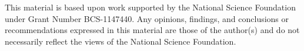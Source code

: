 \documentclass[landscape,final,paperwidth=72in,paperheight=42in,fontscale=0.285]{baposter}
\begin{document}
\begin{poster}
    {
      This material is based upon work supported by the National Science Foundation under Grant Number BCS-1147440. Any opinions, findings, and conclusions or recommendations expressed in this material are those of the author(s) and do not necessarily reflect the views of the National Science Foundation.  
    }    


  {
          \smaller
          
          \renewcommand{\section}[2]{\vskip 0.05em}
        
          
          
%      
%      
%
    }


\end{poster}
\end{document}
